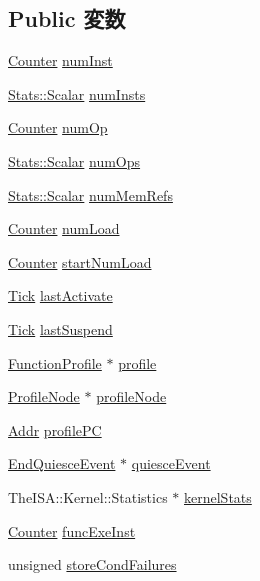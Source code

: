 \subsection*{Public 変数}
\begin{DoxyCompactItemize}
\item 
\hyperlink{base_2types_8hh_ae1475755791765b8e6f6a8bb091e273e}{Counter} \hyperlink{structThreadState_a1431f3f73435dd9b1c68e7e3a303ada0}{numInst}
\item 
\hyperlink{classStats_1_1Scalar}{Stats::Scalar} \hyperlink{structThreadState_a302bf9a6fd3b54c46eb3e2bfb18a320e}{numInsts}
\item 
\hyperlink{base_2types_8hh_ae1475755791765b8e6f6a8bb091e273e}{Counter} \hyperlink{structThreadState_a0cb2e6732f2a0039cb918fc50956616a}{numOp}
\item 
\hyperlink{classStats_1_1Scalar}{Stats::Scalar} \hyperlink{structThreadState_a121c14c0d2e80edfe1e3d01031707c0b}{numOps}
\item 
\hyperlink{classStats_1_1Scalar}{Stats::Scalar} \hyperlink{structThreadState_a6102e519d600e5e0f2d310d628f9a361}{numMemRefs}
\item 
\hyperlink{base_2types_8hh_ae1475755791765b8e6f6a8bb091e273e}{Counter} \hyperlink{structThreadState_a9c78b70028e5df92b15a6fd9c56e5acf}{numLoad}
\item 
\hyperlink{base_2types_8hh_ae1475755791765b8e6f6a8bb091e273e}{Counter} \hyperlink{structThreadState_abc2dac603f413be8cd5f63b5c0b2d48d}{startNumLoad}
\item 
\hyperlink{base_2types_8hh_a5c8ed81b7d238c9083e1037ba6d61643}{Tick} \hyperlink{structThreadState_adba46356f3cbff06bc296a0cf84453e8}{lastActivate}
\item 
\hyperlink{base_2types_8hh_a5c8ed81b7d238c9083e1037ba6d61643}{Tick} \hyperlink{structThreadState_ac2a3eaa24ceabac390386cca70cc0aa3}{lastSuspend}
\item 
\hyperlink{classFunctionProfile}{FunctionProfile} $\ast$ \hyperlink{structThreadState_a57684045e6580be82debaf2ed1d038ff}{profile}
\item 
\hyperlink{classProfileNode}{ProfileNode} $\ast$ \hyperlink{structThreadState_a9e724ad49e865acc300eb316dcf2e9bd}{profileNode}
\item 
\hyperlink{base_2types_8hh_af1bb03d6a4ee096394a6749f0a169232}{Addr} \hyperlink{structThreadState_a8d1675ee887ea4904e7b244eef19c922}{profilePC}
\item 
\hyperlink{classEndQuiesceEvent}{EndQuiesceEvent} $\ast$ \hyperlink{structThreadState_a5845e4af797decd004812fc4e154b3e2}{quiesceEvent}
\item 
TheISA::Kernel::Statistics $\ast$ \hyperlink{structThreadState_af94097bd19d2f3145ab6aececf25815c}{kernelStats}
\item 
\hyperlink{base_2types_8hh_ae1475755791765b8e6f6a8bb091e273e}{Counter} \hyperlink{structThreadState_a344acde4f72898017365be79fd18a323}{funcExeInst}
\item 
unsigned \hyperlink{structThreadState_af112e3f6e9a9305596d19209d67354fb}{storeCondFailures}
\end{DoxyCompactItemize}
